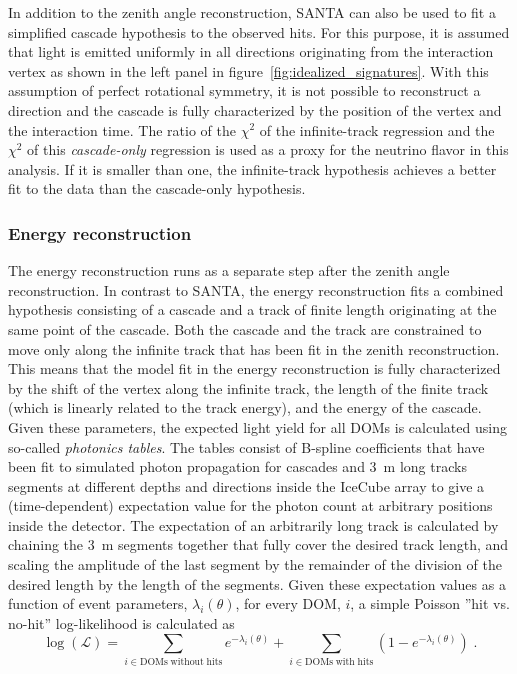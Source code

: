 In addition to the zenith angle reconstruction, SANTA can also be used to fit a simplified cascade hypothesis to the observed hits. For this purpose, it is assumed that light is emitted uniformly in all directions originating from the interaction vertex as shown in the left panel in figure~\ref{fig:idealized_signatures}. With this assumption of perfect rotational symmetry, it is not possible to reconstruct a direction and the cascade is fully characterized by the position of the vertex and the interaction time. The ratio of the $\chi^2$ of the infinite-track regression and the $\chi^2$ of this \emph{cascade-only} regression is used as a proxy for the neutrino flavor in this analysis. If it is smaller than one, the infinite-track hypothesis achieves a better fit to the data than the cascade-only hypothesis.

\subsubsection{Energy reconstruction}
\label{sec:leera}
The energy reconstruction runs as a separate step after the zenith angle reconstruction. In contrast to \textsc{SANTA}, the energy reconstruction fits a combined hypothesis consisting of a cascade and a track of finite length originating at the same point of the cascade. Both the cascade and the track are constrained to move only along the infinite track that has been fit in the zenith reconstruction. This means that the model fit in the energy reconstruction is fully characterized by the shift of the vertex along the infinite track, the length of the finite track (which is linearly related to the track energy), and the energy of the cascade. Given these parameters, the expected light yield for all DOMs is calculated using so-called \emph{photonics tables}. The tables consist of B-spline coefficients that have been fit to simulated photon propagation for cascades and 3~m long tracks segments at different depths and directions inside the IceCube array to give a (time-dependent) expectation value for the photon count at arbitrary positions inside the detector. The expectation of an arbitrarily long track is calculated by chaining the 3~m segments together that fully cover the desired track length, and scaling the amplitude of the last segment by the remainder of the division of the desired length by the length of the segments. Given these expectation values as a function of event parameters, $\lambda_i(\theta)$, for every DOM, $i$, a simple Poisson ''hit vs. no-hit'' log-likelihood is calculated as
\begin{equation}
    \log(\mathcal{L}) = \sum_{i\in\mathrm{DOMs\;without\;hits}} e^{-\lambda_i(\theta)} + \sum_{i\in\mathrm{DOMs\;with\;hits}} (1 - e^{-\lambda_i(\theta)})\;.
    \label{eq:leera-llh}
\end{equation}
